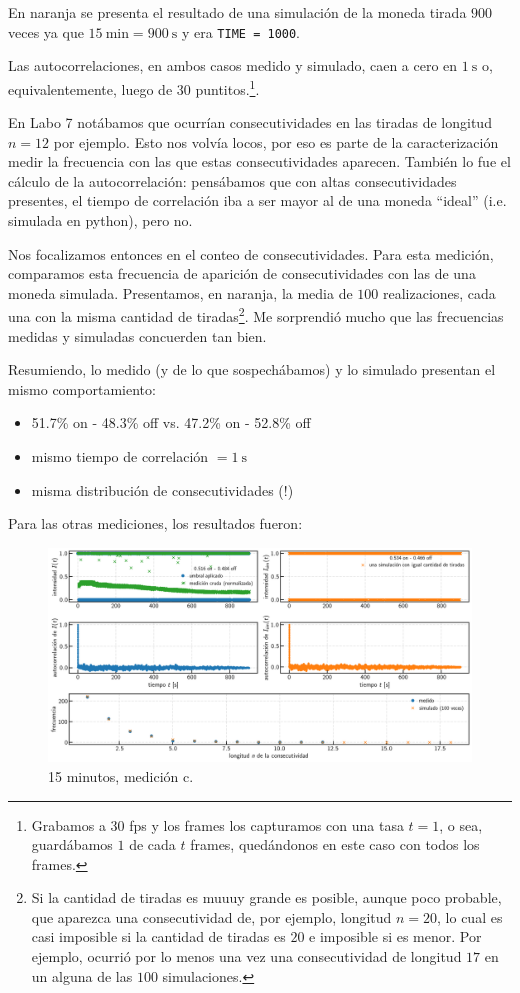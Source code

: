 \documentclass[a4paper]{article}
\begin{document}
En naranja se presenta el resultado de una simulación de la moneda tirada $900$ veces ya que $\SI{15}{\minute} = \SI{900}{\second}$ y era \texttt{TIME = 1000}.

Las autocorrelaciones, en ambos casos medido y simulado, caen a cero en $\SI{1}{\second}$ o, equivalentemente, luego de $30$ puntitos.\footnote{Grabamos a $30$ fps y los frames los capturamos con una tasa $t = 1$, o sea, guardábamos $1$ de cada $t$ frames, quedándonos en este caso con todos los frames.}.

En Labo 7 notábamos que ocurrían consecutividades en las tiradas de longitud $n=12$ por ejemplo. Esto nos volvía locos, por eso es parte de la caracterización medir la frecuencia con las que estas consecutividades aparecen. También lo fue el cálculo de la autocorrelación: pensábamos que con altas consecutividades presentes, el tiempo de correlación iba a ser mayor al de una moneda ``ideal'' (i.e. simulada en python), pero no.



Nos focalizamos entonces en el conteo de consecutividades. Para esta medición, comparamos esta frecuencia de aparición de consecutividades con las de una moneda simulada. Presentamos, en naranja, la media de $100$ realizaciones, cada una con la misma cantidad de tiradas\footnote{Si la cantidad de tiradas es muuuy grande es posible, aunque poco probable, que aparezca una consecutividad de, por ejemplo, longitud $n=20$, lo cual es casi imposible si la cantidad de tiradas es $20$ e imposible si es menor. Por ejemplo, ocurrió por lo menos una vez una consecutividad de longitud $17$ en un alguna de las $100$ simulaciones.}. Me sorprendió mucho que las frecuencias medidas y simuladas concuerden tan bien. 

Resumiendo, lo medido (y de lo que sospechábamos) y lo simulado presentan el mismo comportamiento:
\begin{itemize}
	\item 51.7\% on - 48.3\% off vs. 47.2\% on - 52.8\% off
	\item mismo tiempo de correlación $= \SI{1}{\second}$
	\item misma distribución de consecutividades (!)
\end{itemize}

Para las otras mediciones, los resultados fueron:

\begin{figure}[!h]
	\centering
	\includegraphics[width=\linewidth]{Resultados/15min_c.png}
	\caption{15 minutos, medición c.}
\end{figure}
\end{document}
